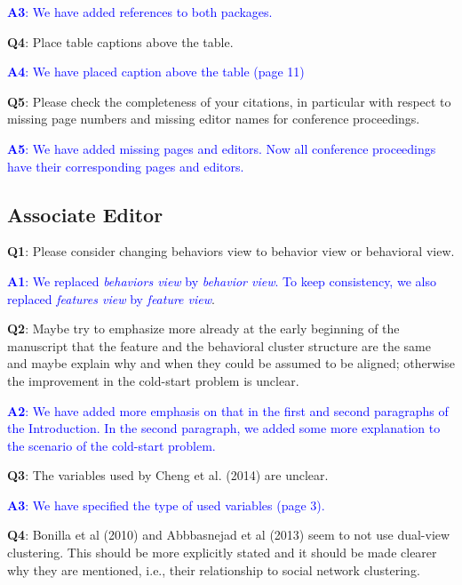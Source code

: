 \documentclass[]{article}
\begin{document}
		\textcolor{blue}{  \textbf{A3}: We have added references to both packages.} 

	\vspace{3mm}	

\textbf{Q4}:  Place table captions above the table.

		\textcolor{blue}{  \textbf{A4}: We have placed caption above the table (page 11)} 

	\vspace{3mm}	

\textbf{Q5}: Please check the completeness of your citations, in particular with respect to missing page numbers and missing editor names for conference proceedings.
		
		\textcolor{blue}{  \textbf{A5}: We have added missing pages and editors. Now all conference proceedings have their corresponding pages and editors.} 
	

	\vspace{3mm}
	
	
	\subsection*{Associate Editor}
	\textbf{Q1}: Please consider changing behaviors view to behavior view or behavioral view.
	
		\textcolor{blue}{  \textbf{A1}: We replaced \textit{behaviors view} by \textit{behavior view}. To keep consistency, we also replaced  \textit{features view} by \textit{feature view}}. 

	
	\vspace{3mm}
	\textbf{Q2}: Maybe try to emphasize more already at the early beginning of the manuscript that the feature and the behavioral cluster structure are the same and maybe explain why and when they could be assumed to be aligned; otherwise the improvement in the cold-start problem is unclear.

	\textcolor{blue}{  
	\textbf{A2}: We have added more emphasis on that in the first and second paragraphs of the Introduction. In the second paragraph, we added some more explanation to the scenario of the cold-start problem. 
	} 

	\vspace{3mm}
	\textbf{Q3}: The variables used by Cheng et al. (2014) are unclear.

	\textcolor{blue}{  
	\textbf{A3}: We have specified the type of used variables (page 3).
	} 
	
		
	\vspace{3mm}
	\textbf{Q4}: Bonilla et al (2010) and Abbbasnejad et al (2013) seem to not use dual-view clustering. This should be more explicitly stated and it should be made clearer why they are mentioned, i.e., their relationship to social network clustering.
	
\end{document}
